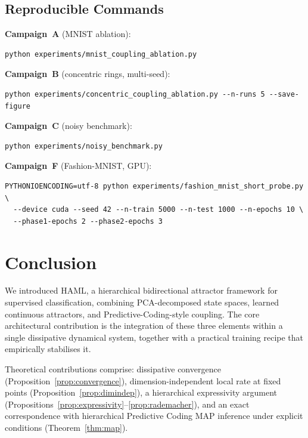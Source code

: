 \documentclass[11pt,a4paper]{article}
\begin{document}
\subsection{Reproducible Commands}

\textbf{Campaign~A} (MNIST ablation):
\begin{verbatim}
python experiments/mnist_coupling_ablation.py
\end{verbatim}

\textbf{Campaign~B} (concentric rings, multi-seed):
\begin{verbatim}
python experiments/concentric_coupling_ablation.py --n-runs 5 --save-figure
\end{verbatim}

\textbf{Campaign~C} (noisy benchmark):
\begin{verbatim}
python experiments/noisy_benchmark.py
\end{verbatim}

\textbf{Campaign~F} (Fashion-MNIST, GPU):
\begin{verbatim}
PYTHONIOENCODING=utf-8 python experiments/fashion_mnist_short_probe.py \
  --device cuda --seed 42 --n-train 5000 --n-test 1000 --n-epochs 10 \
  --phase1-epochs 2 --phase2-epochs 3
\end{verbatim}

\section{Conclusion}

We introduced HAML, a hierarchical bidirectional attractor framework for supervised
classification, combining PCA-decomposed state spaces, learned continuous attractors, and
Predictive-Coding-style coupling. The core architectural contribution is the integration
of these three elements within a single dissipative dynamical system, together with a
practical training recipe that empirically stabilises it.

Theoretical contributions comprise: dissipative convergence (Proposition~\ref{prop:convergence}),
dimension-independent local rate at fixed points (Proposition~\ref{prop:dimindep}),
a hierarchical expressivity argument (Propositions~\ref{prop:expressivity}--\ref{prop:rademacher}),
and an exact correspondence with hierarchical Predictive Coding MAP inference under
explicit conditions (Theorem~\ref{thm:map}).
\end{document}
